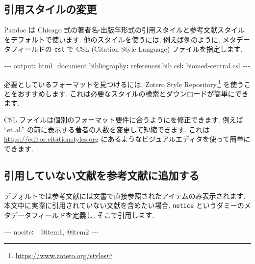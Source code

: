 \documentclass[
  11pt,
  lualatex,
  ja=standard]{bxjsreport}
\newenvironment{Shaded}{\begin{snugshade}}{\end{snugshade}}
\newcommand{\AttributeTok}[1]{\textcolor[rgb]{0.77,0.63,0.00}{#1}}
\newcommand{\CharTok}[1]{\textcolor[rgb]{0.31,0.60,0.02}{#1}}
\newcommand{\FunctionTok}[1]{\textcolor[rgb]{0.00,0.00,0.00}{#1}}
\newcommand{\KeywordTok}[1]{\textcolor[rgb]{0.13,0.29,0.53}{\textbf{#1}}}
\newcommand{\NormalTok}[1]{#1}
\newcommand{\PreprocessorTok}[1]{\textcolor[rgb]{0.56,0.35,0.01}{\textit{#1}}}
\renewcommand{\href}[2]{#2\footnote{\url{#1}}}
\begin{document}
\hypertarget{changing-citation-style}{%
\subsection{引用スタイルの変更}\label{changing-citation-style}}

Pandoc は Chicago 式の著者名-出版年形式の引用スタイルと参考文献スタイルをデフォルトで使います. 他のスタイルを使うには, 例えば例のように, メタデータフィールドの \texttt{csl} で CSL (Citation Style Language) ファイルを指定します.

\begin{Shaded}
\begin{Highlighting}[]
\PreprocessorTok{{-}{-}{-}}
\FunctionTok{output}\KeywordTok{:}\AttributeTok{ html\_document}
\FunctionTok{bibliography}\KeywordTok{:}\AttributeTok{ references.bib}
\FunctionTok{csl}\KeywordTok{:}\AttributeTok{ biomed{-}central.csl}
\PreprocessorTok{{-}{-}{-}}
\end{Highlighting}
\end{Shaded}

必要としているフォーマットを見つけるには, \href{https://www.zotero.org/styles}{Zotero Style Repository,} を使うことをおすすめします. これは必要なスタイルの検索とダウンロードが簡単にできます.

CSL ファイルは個別のフォーマット要件に合うようにを修正できます. 例えば ``et al.'' の前に表示する著者の人数を変更して短縮できます. これは \url{https://editor.citationstyles.org} にあるようなビジュアルエディタを使って簡単にできます.

\hypertarget{add-an-item-to-a-bibliography-without-using-it}{%
\subsection{引用していない文献を参考文献に追加する}\label{add-an-item-to-a-bibliography-without-using-it}}

デフォルトでは参考文献には文書で直接参照されたアイテムのみ表示されます. 本文中に実際に引用されていない文献を含めたい場合, \texttt{notice} というダミーのメタデータフィールドを定義し, そこで引用します.

\begin{Shaded}
\begin{Highlighting}[]
\PreprocessorTok{{-}{-}{-}}
\FunctionTok{nocite}\KeywordTok{: }\CharTok{|}
\NormalTok{  @item1, @item2}
\PreprocessorTok{{-}{-}{-}}
\end{Highlighting}
\end{Shaded}
\end{document}
